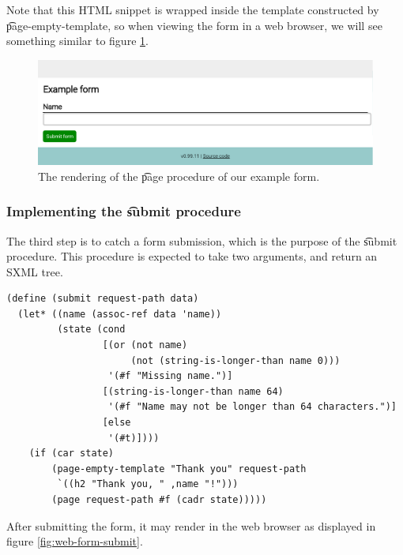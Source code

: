   Note that this HTML snippet is wrapped inside the template constructed by
  \t{page-empty-template}, so when viewing the form in a web browser, we
  will see something similar to figure \ref{fig:web-form-example}.

  \begin{figure}[H]
    \begin{center}
      \includegraphics[width=1.0\textwidth]{figures/sg-web-form-example.pdf}
    \end{center}
    \caption{The rendering of the \t{page} procedure of our example form.}
    \label{fig:web-form-example}
  \end{figure}

\subsubsection{Implementing the \t{submit} procedure}

  The third step is to catch a form submission, which is the purpose of the
  \t{submit} procedure.  This procedure is expected to take two arguments,
  and return an SXML tree.

\begin{siderules}
\begin{verbatim}
(define (submit request-path data)
  (let* ((name (assoc-ref data 'name))
         (state (cond
                 [(or (not name)
                      (not (string-is-longer-than name 0)))
                  '(#f "Missing name.")]
                 [(string-is-longer-than name 64)
                  '(#f "Name may not be longer than 64 characters.")]
                 [else
                  '(#t)])))
    (if (car state)
        (page-empty-template "Thank you" request-path
         `((h2 "Thank you, " ,name "!")))
        (page request-path #f (cadr state)))))
\end{verbatim}
\end{siderules}

  After submitting the form, it may render in the web browser as displayed
  in figure \ref{fig:web-form-submit}.

